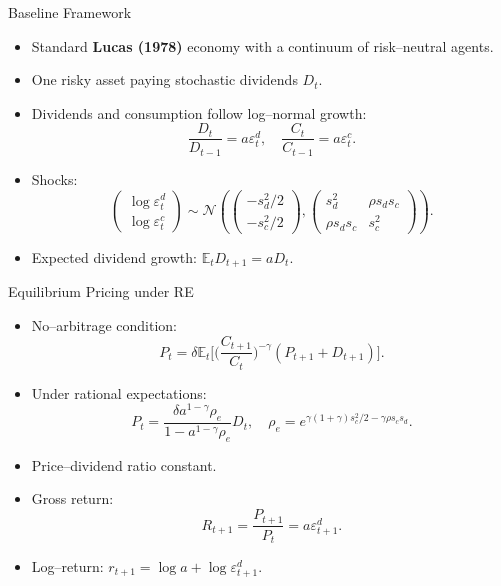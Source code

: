 \documentclass[compress,12pt]{beamer}
\begin{document}
\begin{frame}{Baseline Framework}
\begin{itemize}
    \item Standard \textbf{Lucas (1978)} economy with a continuum of risk–neutral agents.
    \item One risky asset paying stochastic dividends \( D_t \).
    \item Dividends and consumption follow log–normal growth:
    \[
    \frac{D_t}{D_{t-1}} = a \varepsilon^d_t, 
    \quad
    \frac{C_t}{C_{t-1}} = a \varepsilon^c_t.
    \]
    \item Shocks:
    \[
    \begin{pmatrix}\log \varepsilon^d_t \\ \log \varepsilon^c_t \end{pmatrix}
    \sim \mathcal{N}\left(
    \begin{pmatrix} -s_d^2/2 \\ -s_c^2/2 \end{pmatrix},
    \begin{pmatrix} s_d^2 & \rho s_d s_c \\ \rho s_d s_c & s_c^2 \end{pmatrix}
    \right).
    \]
    \item Expected dividend growth: \( \mathbb{E}_t D_{t+1} = a D_t. \)
\end{itemize}
\end{frame}

\begin{frame}{Equilibrium Pricing under RE}
\begin{itemize}
    \item No–arbitrage condition:
    \[
    P_t = \delta \mathbb{E}_t \Big[\Big(\frac{C_{t+1}}{C_t}\Big)^{-\gamma}(P_{t+1}+D_{t+1}) \Big].
    \]
    \item Under rational expectations:
    \[
    P_t = \frac{\delta a^{1-\gamma}\rho_e}{1 - a^{1-\gamma}\rho_e} D_t,
    \quad
    \rho_e = e^{\gamma(1+\gamma)s_c^2/2 - \gamma\rho s_c s_d}.
    \]
    \item Price–dividend ratio constant.
    \item Gross return:
    \[
    R_{t+1} = \frac{P_{t+1}}{P_t} = a \varepsilon^d_{t+1}.
    \]
    \item Log–return: \( r_{t+1} = \log a + \log \varepsilon^d_{t+1} \).
\end{itemize}
\end{frame}
\end{document}
